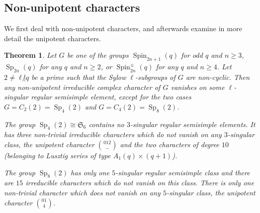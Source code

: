 \documentclass{ert-l}
\newcommand{\fS}{{\mathfrak{S}}}
\newcommand{\Sp}{{\operatorname{Sp}}}
\newcommand{\Spin}{{\operatorname{Spin}}}
\let\sys=\binom
\newtheorem{thm}{Theorem}[section]
\theoremstyle{definition}
\theoremstyle{remark}
\begin{document}
\subsection{Non-unipotent characters}   \label{ssec:nonunipotent}

We first deal with non-unipotent characters, and afterwards examine in
more detail the unipotent characters.

\begin{thm}   \label{thm:non-unip}
 Let $G$ be one of the groups $\Spin_{2n+1}(q)$ for odd $q$ and $n \geq 3$,
 $\Sp_{2n}(q)$ for any $q$ and $n \geq 2$, or $\Spin^\pm_{2n}(q)$ for any $q$
 and $n \geq 4$. Let $2\ne\ell{\not|}q$ be a prime such that the Sylow
 $\ell$-subgroups of $G$ are non-cyclic. Then any non-unipotent irreducible
 complex character of $G$ vanishes on some $\ell$-singular regular semisimple
 element, except for the two cases $G=C_2(2)=\Sp_4(2)$ and $G=C_4(2)=\Sp_8(2)$.

 The group $\Sp_4(2)\cong\fS_6$ contains no $3$-singular regular semisimple
 elements. It has three non-trivial irreducible characters which do not vanish
 on any $3$-singular class, the unipotent character $\sys{0 1 2}{-}$ and the
 two characters of degree $10$ (belonging to Lusztig series of type
 $A_1(q)\times (q+1)$).

 The group $\Sp_8(2)$ has only one $5$-singular regular semisimple class and
 there are $15$ irreducible characters which do not vanish on this class.
 There is only one non-trivial character which does not vanish on any
 $5$-singular class, the unipotent character $\sys{0 1}{4}$.
\end{thm}
\end{document}
